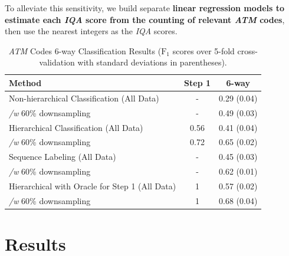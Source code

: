 \documentclass[runningheads]{llncs}
\begin{document}
  To alleviate this sensitivity, we  build separate {\bf linear regression models to estimate each \textit{IQA}  score from the counting of relevant \textit{ATM} codes}, then use the nearest integers as the \textit{IQA}  scores.
 \begin{table} [t]
\centering
\caption{\textit{ATM} Codes 6-way Classification Results ($\mathrm{F_1}$ scores over 5-fold cross-validation with standard deviations in parentheses).}
\label{tab:atm}
\begin{tabular}{l|c|c}
\hfil \textbf{Method} & \textbf{Step 1} & \textbf{6-way}\\
\hline
Non-hierarchical Classification (All Data) & - & 0.29 (0.04)\\
\hspace{4mm} \textit{/w} 60\% downsampling & - & 0.49 (0.03) \\
\hline
Hierarchical Classification (All Data) & 0.56 & 0.41 (0.04)\\
\hspace{4mm} \textit{/w} 60\% downsampling & 0.72 & 0.65 (0.02)\\
\hline
Sequence Labeling (All Data)& - & 0.45 (0.03)\\
\hspace{4mm} \textit{/w} 60\% downsampling & - & 0.62 (0.01)\\
\hline
\hline
Hierarchical with Oracle for Step 1 (All Data) & 1 & 0.57 (0.02)\\
\hspace{4mm} \textit{/w} 60\% downsampling & 1 & 0.68 (0.04) \\
\end{tabular}
\end{table}
\section{Results}
\end{document}
